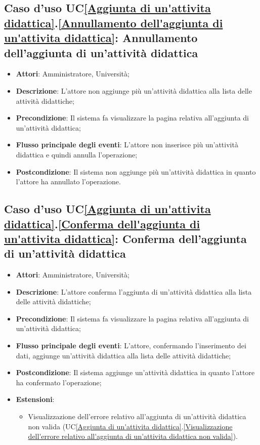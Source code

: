 \subsection{Caso d'uso UC\ref{Aggiunta di un'attivita didattica}.\ref{Annullamento dell'aggiunta di un'attivita didattica}: Annullamento dell'aggiunta di un'attività didattica}
\begin{itemize}
	\item \textbf{Attori}: Amministratore, Università;
	\item \textbf{Descrizione}: L'attore non aggiunge più un'attività didattica alla lista delle attività didattiche;
	
	\item \textbf{Precondizione}: Il sistema fa visualizzare la pagina relativa all'aggiunta di un'attività didattica;
	
	\item \textbf{Flusso principale degli eventi}: L'attore non inserisce più un'attività didattica e quindi annulla l'operazione;
	
	\item \textbf{Postcondizione}: Il sistema non aggiunge più un'attività didattica in quanto l'attore ha annullato l'operazione.
\end{itemize}

\subsection{Caso d'uso UC\ref{Aggiunta di un'attivita didattica}.\ref{Conferma dell'aggiunta di un'attivita didattica}: Conferma dell'aggiunta di un'attività didattica}
\begin{itemize}
	\item \textbf{Attori}: Amministratore, Università;
	\item \textbf{Descrizione}: L'attore conferma l'aggiunta di un'attività didattica alla lista delle attività didattiche;
	
	\item \textbf{Precondizione}: Il sistema fa visualizzare la pagina relativa all'aggiunta di un'attività didattica;
	
	\item \textbf{Flusso principale degli eventi}: L'attore, confermando l'inserimento dei dati, aggiunge un'attività didattica alla lista delle attività didattiche;
	
	\item \textbf{Postcondizione}: Il sistema aggiunge un'attività didattica in quanto l'attore ha confermato l'operazione;
	
	\item \textbf{Estensioni}:
	\begin{itemize}
		\item Visualizzazione dell'errore relativo all'aggiunta di un'attività didattica non valida (UC\ref{Aggiunta di un'attivita didattica}.\ref{Visualizzazione dell'errore relativo all'aggiunta di un'attivita didattica non valida}).
	\end{itemize}
\end{itemize}

